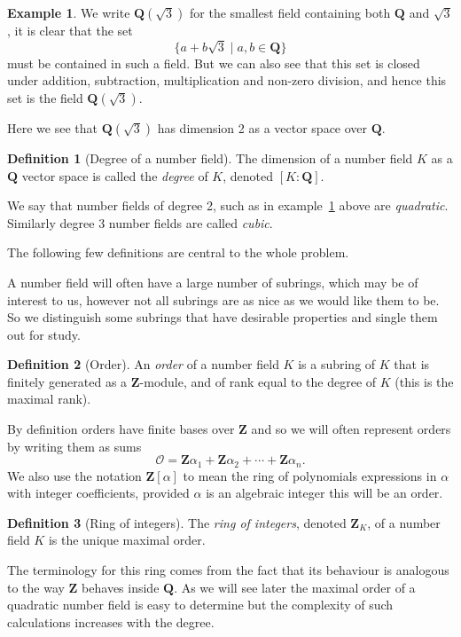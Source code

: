 \documentclass[12pt,a4paper,abstracton,bibtotoc]{scrreprt}
\theoremstyle{definition}
\newtheorem{defn}{Definition}
\newtheorem{ex}{Example}
\newcommand{\QQ}{\mathbf{Q}}
\newcommand{\ZZ}{\mathbf{Z}}
\renewcommand{\O}{\mathcal{O}}
\begin{document}
\begin{ex}\label{ex:quad}
We write $\QQ(\sqrt{3})$ for the smallest field containing both $\QQ$ and $\sqrt{3}$, it is clear that the set
\[
\{a + b\sqrt{3}\mid a,b \in \QQ\}
\]
must be contained in such a field.
But we can also see that this set is closed under addition, subtraction, multiplication and non-zero division, and hence this set is the field $\QQ(\sqrt{3})$.

Here we see that $\QQ(\sqrt{3})$ has dimension 2 as a vector space over $\QQ$.
\end{ex}

\begin{defn}[Degree of a number field]
The dimension of a number field $K$ as a $\QQ$ vector space is called the \emph{degree} of $K$, denoted $[K:\QQ]$.

We say that number fields of degree 2, such as in example~\ref{ex:quad} above are \emph{quadratic}.
Similarly degree 3 number fields are called \emph{cubic}.
\end{defn}

\minisec{}
The following few definitions are central to the whole problem.

A number field will often have a large number of subrings, which may be of interest to us, however not all subrings are as nice as we would like them to be.
So we distinguish some subrings that have desirable properties and single them out for study.

\begin{defn}[Order]
An \emph{order} of a number field $K$ is a subring of $K$ that is finitely generated as a $\ZZ$-module, and of rank equal to the degree of $K$ (this is the maximal rank).
\end{defn}

By definition orders have finite bases over $\ZZ$ and so we will often represent orders by writing them as sums 
\[
\O = \ZZ\alpha_1 + \ZZ \alpha_2 + \cdots + \ZZ \alpha_n.
\]
We also use the notation $\ZZ[\alpha]$ to mean the ring of polynomials expressions in $\alpha$ with integer coefficients, provided $\alpha$ is an algebraic integer this will be an order.

\begin{defn}[Ring of integers]
The \emph{ring of integers}, denoted $\ZZ_K$, of a number field $K$ is the unique maximal order.
\end{defn}

The terminology for this ring comes from the fact that its behaviour is analogous to the way $\ZZ$ behaves inside $\QQ$.
As we will see later the maximal order of a quadratic number field is easy to determine but the complexity of such calculations increases with the degree.
\end{document}
